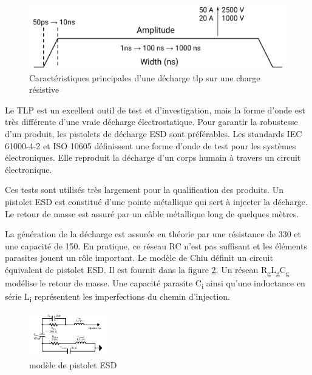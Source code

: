 \begin{figure}[!h]
  \centering
  \includegraphics[width=\textwidth]{src/1/figures/tlp_pulse.pdf}
  \caption{Caractéristiques principales d'une décharge \gls{tlp} sur une charge résistive}
  \label{tlp_pulse}
\end{figure}

Le TLP est un excellent outil de test et d'investigation, mais la forme d'onde est très différente d'une vraie décharge électrostatique.
Pour garantir la robustesse d'un produit, les pistolets de décharge ESD sont préférables.
Les standards IEC 61000-4-2 \cite{iec61000-4-2} et ISO 10605 \cite{iso10605} définissent une forme d'onde de test pour les systèmes électroniques.
Elle reproduit la décharge d'un corps humain à travers un circuit électronique.

Ces tests sont utilisés très largement pour la qualification des produits.
Un pistolet ESD est constitué d'une pointe métallique qui sert à injecter la décharge.
Le retour de masse est assuré par un câble métallique long de quelques mètres.

La génération de la décharge est assurée en théorie par une résistance de 330\textOmega{} et une capacité de 150.
En pratique, ce réseau RC n'est pas suffisant et les éléments parasites jouent un rôle important.
Le modèle de Chiu \cite{phd-chiu} définit un circuit équivalent de pistolet ESD.
Il est fournit dans la figure \ref{fig:esd-gun-model}.
Un réseau R\textsubscript{g}L\textsubscript{g}C\textsubscript{g} modélise le retour de masse.
Une capacité parasite C\textsubscript{i} ainsi qu'une inductance en série L\textsubscript{i} représentent les imperfections du chemin d'injection.

\begin{figure}[!h]
  \centering
  \includegraphics[width=0.3\textwidth]{src/1/figures/gun_model.pdf}
  \caption{modèle de pistolet ESD}
  \label{fig:esd-gun-model}
\end{figure}

